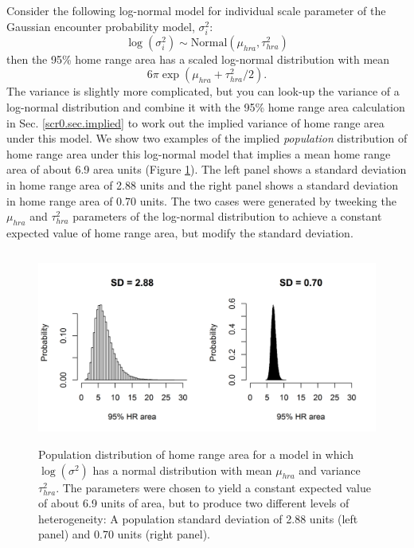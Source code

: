 Consider the following log-normal model for individual scale parameter
of the Gaussian encounter probability model, $\sigma_{i}^{2}$:
\[
 \log(\sigma^{2}_{i}) \sim \mbox{Normal}(\mu_{hra}, \tau^{2}_{hra})
\]
then the 95\% home range area has a scaled
log-normal distribution with mean 
\[
6 \pi \exp(\mu_{hra} + \tau^{2}_{hra}/2). 
\]
The variance is slightly more complicated, but you
can look-up  the variance of a log-normal distribution and combine it
with the 95\% home range area calculation in
Sec. \ref{scr0.sec.implied} to work out the implied variance of home
range area under this model.
We show two examples of the implied {\it population} distribution of
home range area under this log-normal model that implies 
 a mean home range area of about 6.9 area units (Figure
\ref{covariates.fig.one}). The left panel shows a standard deviation
in home range area of 2.88 units and the right panel shows a standard
deviation in home range area of 0.70 units. The two cases were
generated by tweeking the $\mu_{hra}$ and $\tau^{2}_{hra}$ parameters
of the log-normal distribution to achieve a constant expected value of
home range area, but modify the standard deviation. 




\begin{figure}[ht]
\begin{center}
\includegraphics[height=2.5in,width=5in]{Ch7-Covariates/figs/area_heterogeneity.png}
\end{center}
\caption{
Population distribution of home range area for a model in which
$\log(\sigma^{2})$ has a normal distribution with mean $\mu_{hra}$ and
variance $\tau^{2}_{hra}$. The parameters were chosen to yield a
constant expected value of about 6.9 units of area, but to produce two
different levels of heterogeneity: A population standard deviation of
2.88 units (left panel) and 0.70 units (right panel). 
}
\label{covariates.fig.one}
\end{figure}



